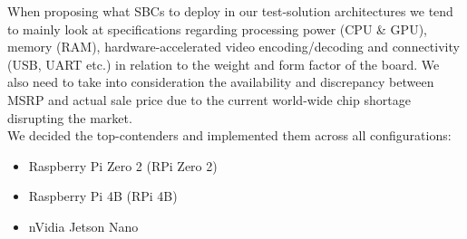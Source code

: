 When proposing what SBCs to deploy in our test-solution architectures we tend to mainly look at specifications regarding processing power (CPU \& GPU), memory (RAM), hardware-accelerated video encoding/decoding and connectivity (USB, UART etc.) in relation to the weight and form factor of the board. We also need to take into consideration the availability and discrepancy between MSRP and actual sale price due to the current world-wide chip shortage disrupting the market.\\

We decided the top-contenders and implemented them across all configurations:
\begin{itemize}
    \item Raspberry Pi Zero 2 (RPi Zero 2)
    \item Raspberry Pi 4B (RPi 4B)
    \item nVidia Jetson Nano
\end{itemize}

